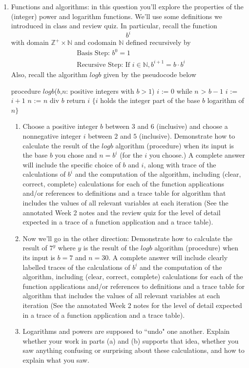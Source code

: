 \documentclass[12pt, oneside]{article}
\begin{document}
\begin{enumerate}[labelindent=0pt, leftmargin=0pt]
\item Functions and algorithms: in this question you'll explore the properties of the (integer) power and logarithm
functions. We'll use some definitions we introduced in class and review quiz.
In particular, recall the function
$$b^i$$ with domain $\mathbb{Z}^+ \times \mathbb{N}$ and codomain $\mathbb{N}$ defined recursively by
\begin{align*}    
&\textrm{Basis Step: } b^0 = 1 \\
&\textrm{Recursive Step: } \textrm{If } i \in \mathbb{N}, b^{i+1} = b \cdot b^i
\end{align*}
Also, recall the algorithm $logb$ given by the pseudocode below


\begin{algorithm}[caption={Calculating integer part of base $b$ logarithm}]
   procedure $logb$($b$,$n$: positive integers with $b > 1$)
   $i$ := $0$
   while $n$ > $b-1$
     $i$ := $i + 1$
     $n$ := $n$ div $b$
   return $i$ $\{ i$ holds the integer part of the base $b$ logarithm of $n\}$
\end{algorithm} 

    \begin{enumerate}
    \item Choose a positive integer $b$ between $3$ and $6$ (inclusive) and choose a 
    nonnegative integer $i$ between $2$ and $5$ (inclusive). Demonstrate how to calculate 
    the result of the $logb$ algorithm (procedure) when its input is the base $b$ you chose and
    $n = b^i$ (for the $i$ you choose.) 
    A complete answer will include the specific choice of $b$ and $i$, along with 
    trace of the calculations of $b^i$ and the computation of the algorithm, including 
    (clear, correct, complete) calculations for each of the function applications 
    and/or references to definitions and a trace table for algorithm that includes the values of all relevant 
    variables at each iteration (See the annotated Week 2 notes and the review quiz for the level of detail expected
    in a trace of a function application and a trace table).
    \item Now we'll go in the other direction: Demonstrate how to calculate the result of 
    $7^y$ where $y$ is the result of the $logb$ algorithm (procedure) when its input is $b=7$ and $n=30$.
    A complete answer will include clearly labelled 
    traces of the calculations of $b^i$ and the computation of the algorithm, including 
    (clear, correct, complete) calculations for each of the function applications 
    and/or references to definitions and a trace table for algorithm that includes the values of all relevant 
    variables at each iteration (See the annotated Week 2 notes for the level of detail expected
    in a trace of a function application and a trace table).    
    \item Logarithms and powers are supposed to ``undo" one another. Explain whether your work in parts (a) and (b)
    supports that idea,  whether you saw anything confusing or surprising about these calculations, and how to explain what you saw.
    \end{enumerate}


\end{enumerate}
\end{document}
